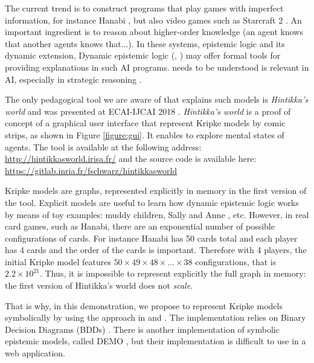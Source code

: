 The current trend is to construct programs that play games with imperfect information, for instance Hanabi \cite{DBLP:journals/corr/abs-1902-00506}, but also video games such as Starcraft 2 \cite{DBLP:conf/ijcai/HuLLPX18}. An important ingredient is to reason about higher-order knowledge (an agent knows that another agents knows that...). In these systems, epistemic logic and its dynamic extension, Dynamic epistemic logic (\cite{baltag1998logic}, \cite{DitmarschvdHoekKooi}) may offer formal tools for providing explanations in such AI programs. needs to be understood is relevant in AI, especially in strategic reasoning \cite{DBLP:journals/ijgt/Aumann99}.

The only pedagogical tool we are aware of that explains such models is \emph{Hintikka's world} and was presented at ECAI-IJCAI 2018 \cite{DBLP:conf/ijcai/Schwarzentruber18}. 
\emph{Hintikka's world} is a proof of concept of a graphical user interface that represent Kripke models by  comic strips, as shown in Figure \ref{figure:gui}. It enables to explore mental states of agents. The tool is available at the following address:
\url{http://hintikkasworld.irisa.fr/} and the source code is available here:
\url{https://gitlab.inria.fr/fschwarz/hintikkasworld}


Kripke models are graphs, represented explicitly in memory in the first version of the tool. Explicit models are useful to learn how dynamic epistemic logic works by means of toy examples: muddy children, Sally and Anne  \cite{wimmer1983beliefs}, etc.  However, in real card games, such as Hanabi, there are an exponential number of possible configurations of cards. For instance Hanabi has 50 cards total and each player has 4 cards and the order of the cards is important. Therefore with 4 players, the initial Kripke model features $50 \times 49 \times 48 \times \dots \times 38$ configurations, that is $2.2 \times 10^{21}$. Thus, it is impossible to represent explicitly the full graph in memory:  the first version of Hintikka's world does not \emph{scale}. 



That is why, in this demonstration, we propose to represent Kripke models symbolically by using the approach in \cite{DBLP:conf/atal/CharrierS17} and \cite{DBLP:conf/aiml/CharrierS18}. The implementation relies on Binary Decision Diagrams (BDDs) \cite{DBLP:journals/tc/Bryant86}. There is another implementation of symbolic epistemic models, called DEMO \cite{DBLP:conf/lori/BenthemEGS15}, but their implementation is difficult to use in a web application. %






